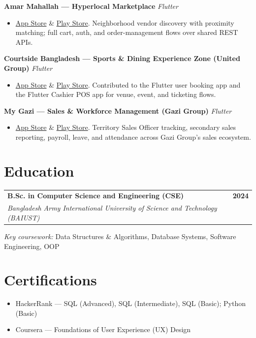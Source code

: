\documentclass[a4paper,10pt]{article}
\makeatletter
\newcommand{\smallgap}{\vspace{1pt}}
\newcommand{\medgap}{\vspace{3pt}}
\newcommand{\entry}[4]{
  \begin{tabularx}{\textwidth}{@{}X r@{}}
    \textbf{#1} & \textbf{#2} \\
    \textit{#3} & \textit{#4} \\
  \end{tabularx}
}
\newcommand{\project}[2]{%
  \smallgap
  \noindent\textbf{#1} \hfill \textit{#2}\par
}
\makeatother
\begin{document}
\project{Amar Mahallah --- Hyperlocal Marketplace}{Flutter}
\begin{itemize}
  \item \href{https://apps.apple.com/ng/app/amar-mahallah/id6737305293}{App Store} \& \href{https://play.google.com/store/apps/details?id=com.amar_mahallah.amar_mahallah}{Play Store}. Neighborhood vendor discovery with proximity matching; full cart, auth, and order-management flows over shared REST APIs.
\end{itemize}

\project{Courtside Bangladesh --- Sports \& Dining Experience Zone (United Group)}{Flutter}
\begin{itemize}
  \item \href{https://apps.apple.com/us/app/courtside-bangladesh/id6476599293}{App Store} \& \href{https://play.google.com/store/apps/details?id=com.osl.courtside}{Play Store}. Contributed to the Flutter user booking app and the Flutter Cashier POS app for venue, event, and ticketing flows.
\end{itemize}

\project{My Gazi --- Sales \& Workforce Management (Gazi Group)}{Flutter}
\begin{itemize}
  \item \href{https://apps.apple.com/us/app/gazi-sales/id6502892439}{App Store} \& \href{https://play.google.com/store/apps/details?id=com.osl.gazi_sales_app}{Play Store}. Territory Sales Officer tracking, secondary sales reporting, payroll, leave, and attendance across Gazi Group's sales ecosystem.
\end{itemize}

\medgap

\section*{Education}
\entry{B.Sc. in Computer Science and Engineering (CSE)}{2024}{Bangladesh Army International University of Science and Technology (BAIUST)}{}
\textit{Key coursework:} Data Structures \& Algorithms, Database Systems, Software Engineering, OOP

\medgap

\section*{Certifications}
\begin{itemize}
  \item HackerRank --- SQL (Advanced), SQL (Intermediate), SQL (Basic); Python (Basic)
  \item Coursera --- Foundations of User Experience (UX) Design
\end{itemize}
\end{document}
